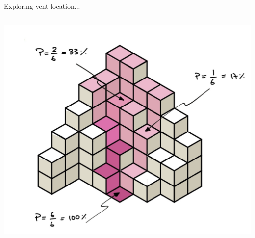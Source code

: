 \documentclass[10pt,aspectratio=169]{beamer}
\begin{document}
\begin{frame}[t]{Exploring vent location...}
\begin{columns}[T]
\begin{column}{0.5\textwidth}
{        \includegraphics[width=1\textwidth]{../docs/img/hydro/prob3.png}
      }
    \end{column}
  \end{columns}
\end{frame}
\end{document}
